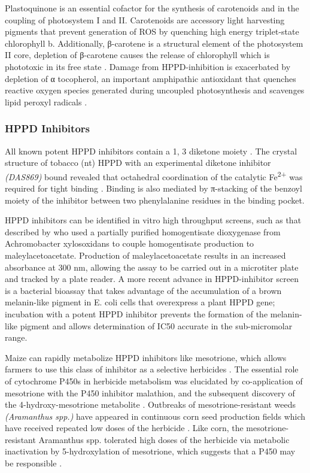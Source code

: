 \documentclass[16pt]{book}
\begin{document}
Plastoquinone is an essential cofactor for the synthesis of carotenoids and in the coupling of photosystem I and II. 
Carotenoids are accessory light harvesting pigments that prevent generation of ROS by quenching high energy triplet-state chlorophyll b. 
Additionally, β-carotene is a structural element of the photosystem II core, depletion of β-carotene causes the release of chlorophyll which is phototoxic in its free state \cite{kramer2007modern}. 
Damage from HPPD-inhibition is exacerbated by depletion of α tocopherol, an important amphipathic antioxidant that quenches reactive oxygen species generated during uncoupled photosynthesis and scavenges lipid peroxyl radicals \cite{munne2005role}.
 
\subsubsection{HPPD Inhibitors}
All known potent HPPD inhibitors contain a 1, 3 diketone moiety \cite{kaundun2017mechanism}. 
The crystal structure of tobacco (nt) HPPD with an experimental diketone inhibitor \textit{(DAS869)} bound revealed that octahedral coordination of the catalytic Fe\textsuperscript{2+} was required for tight binding \cite{yang2004structural}. 
Binding is also mediated by π-stacking of the benzoyl moiety of the inhibitor between two phenylalanine residues in the binding pocket.


HPPD inhibitors can be identified in vitro high throughput screens, such as that described by \cite{yang2004structural} who used a partially purified homogentisate dioxygenase from Achromobacter xylosoxidans to couple homogentisate production to maleylacetoacetate. 
Production of maleylacetoacetate results in an increased absorbance at 300 nm, allowing the assay to be carried out in a microtiter plate and tracked by a plate reader. 
A more recent advance in HPPD-inhibitor screen is a bacterial bioassay \cite{rocaboy2014novel} that takes advantage of the accumulation of a brown melanin-like pigment in E. coli cells that overexpress a plant HPPD gene; incubation with a potent HPPD inhibitor prevents the formation of the melanin-like pigment and allows determination of IC50 accurate in the sub-micromolar range.


Maize can rapidly metabolize HPPD inhibitors like mesotrione, which allows farmers to use this class of inhibitor as a selective herbicides \cite{hawkes2001mesotrione}. 
The essential role of cytochrome P450s in herbicide metabolism was elucidated by co-application of mesotrione with the P450 inhibitor malathion, and the subsequent discovery of the 4-hydroxy-mesotrione metabolite \cite{hawkes2001mesotrione}. 
Outbreaks of mesotrione-resistant weeds \textit{(Aramanthus spp.)} 
have appeared in continuous corn seed production fields which have received repeated low doses of the herbicide \cite{hausman2011resistance}. 
Like corn, the mesotrione-resistant Aramanthus spp. tolerated high doses of the herbicide via metabolic inactivation by 5-hydroxylation of mesotrione, which suggests that a P450 may be responsible \cite{kaundun2017mechanism}.
\end{document}

